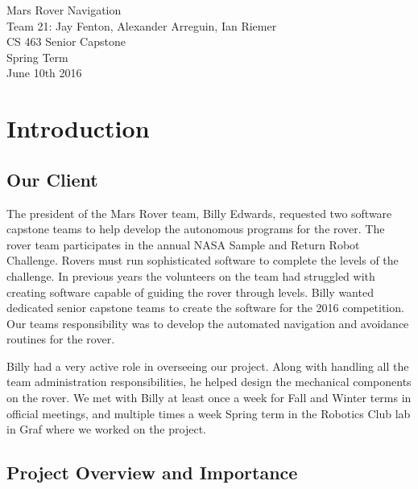 \documentclass[10pt, oneside,onecolumn]{IEEEtran}
\begin{document}
\setcounter{tocdepth}{0}
\tableofcontents

\begin{titlepage}
\begin{center}
        \vspace*{6cm}
        {\Huge Mars Rover Navigation}\\[1cm]
        {\Large Team 21: Jay Fenton, Alexander Arreguin, Ian Riemer}\\[.5cm]
        {\Large CS 463 Senior Capstone}\\[.5cm]
        {\Large Spring Term}\\[.5cm]
        {\Large June 10th 2016}\\[8cm]
\end{center}

\section{Introduction}
\subsection{Our Client}

The president of the Mars Rover team, Billy Edwards, requested two software capstone teams to help develop the autonomous programs for the rover. The rover team participates in the annual NASA Sample and Return Robot Challenge. Rovers must run sophisticated software to complete the levels of the challenge. In previous years the volunteers on the team had struggled with creating software capable of guiding the rover through levels. Billy wanted dedicated senior capstone teams to create the software for the 2016 competition. Our teams responsibility was to develop the automated navigation and avoidance routines for the rover. 

Billy had a very active role in overseeing our project. Along with handling all the team administration responsibilities, he helped design the mechanical components on the rover. We met with Billy at least once a week for Fall and Winter terms in official meetings, and multiple times a week Spring term in the Robotics Club lab in Graf where we worked on the project. 

\subsection{Project Overview and Importance}


\end{titlepage}
\end{document}
